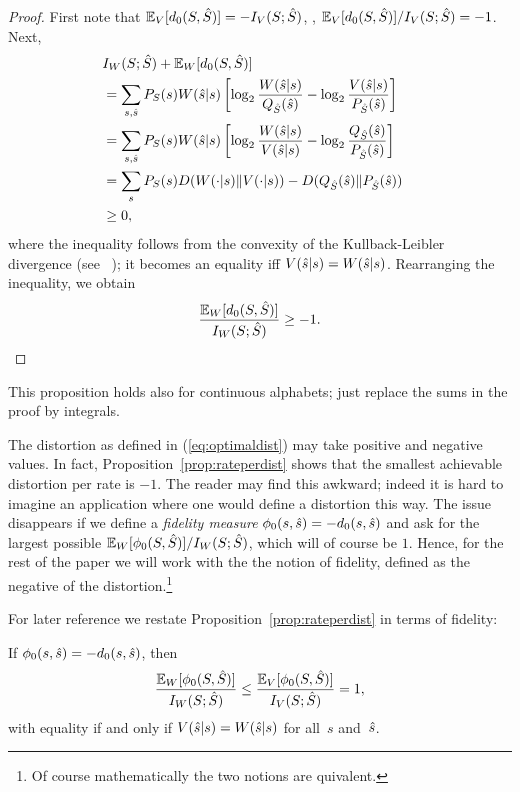 \begin{proof}
  First note that ${\mathbb{E}_V}[{d_0}(S,{\hat{S}})] = -I_V(S;{\hat{S}})$, \ie,
  ${\mathbb{E}_V}[{d_0}(S,{\hat{S}})]/I_V(S;{\hat{S}}) = -1$. Next,
  \begin{align*}
    \lefteqn{\Iw(S;\Sh) + \Ew[\dz(S,\Sh)]} \\
    &=
    \sum_{s,\sh} \ps(s)W(\sh|s) \left[ \log_2 \frac{W(\sh|s)}{\qsh(\sh)} -
    \log_2 \frac{V(\sh|s)}{\psh(\sh)} \right] \\
    &= \sum_{s,\sh} \ps(s)W(\sh|s) \left[ \log_2\frac{W(\sh|s)}{V(\sh|s)} -
    \log_2 \frac{\qsh(\sh)}{\psh(\sh)} \right] \\
    &= \sum_s \ps(s) D(W(\cdot|s) \| V(\cdot |s)) - D(\qsh(\sh) \| \psh(\sh)) \\
    &\ge 0,
  \end{align*}
  where the inequality follows from the convexity of the Kullback-Leibler
  divergence (see \eg~\cite[Thm~2.7.2]{CoverT1991}); it becomes an equality iff
  $V({\hat{s}}|s) = W({\hat{s}}|s)$. Rearranging the inequality, we obtain
  \[ \frac{{\mathbb{E}_W}[{d_0}(S,{\hat{S}})]}{I_W(S;{\hat{S}})} \ge -1. \]
\end{proof}


\begin{remark}
  This proposition holds also for continuous alphabets; just replace the
  sums in the proof by integrals.
\end{remark}

The distortion as defined in (\ref{eq:optimaldist}) may take positive and
negative values. In fact, Proposition~\ref{prop:rateperdist} shows that the
smallest achievable distortion per rate is $-1$.  The reader may find this
awkward; indeed it is hard to imagine an application where one would define a
distortion this way. The issue disappears if we define a {\em fidelity measure}
$\phi_0(s,{\hat{s}})=- {d_0}(s, {\hat{s}})$ and ask for the largest possible ${\mathbb{E}_W}[{\phi_0}(S,{\hat{S}})]
/ I_W(S;{\hat{S}})$, which will of course be $1$. Hence, for the rest of the paper we
will work with the the notion of fidelity, defined as the negative of the
distortion.\footnote{Of course mathematically the two notions are
quivalent.}

For later reference we restate Proposition~\ref{prop:rateperdist} in terms of
fidelity:

\begin{proposition}
  If ${\phi_0}(s,{\hat{s}}) = -{d_0}(s,{\hat{s}})$, then
  \label{prop:rateperfid}
  \begin{equation}
    \label{eq:rateperfid}
    \frac{{\mathbb{E}_W}[\phi_0(S,{\hat{S}})]}{I_W(S;{\hat{S}})} \leq
    \frac{{\mathbb{E}_V}[\phi_0(S,{\hat{S}})]}{I_V(S;{\hat{S}})} = 1,
  \end{equation}
  with equality if and only if $V({\hat{s}}|s) = W({\hat{s}}|s)$ for all~$s$ and~${\hat{s}}$.
\end{proposition}

